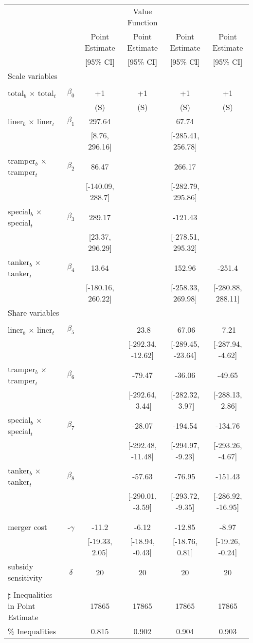 \begin{tabular}{@{\extracolsep{5pt}}lccccc}
\toprule 
 &  &  & Value Function &  &  \\
 &  & Point Estimate & Point Estimate & Point Estimate & Point Estimate \\
 &  & [95\% CI] & [95\% CI] & [95\% CI] & [95\% CI] \\
\midrule 
Scale variables &  &  &  &  &  \\
 &  &  &  &  \\
total$_{b}$ $\times$ total$_{t}$ & $\beta_0$ & +1 & +1 & +1 & +1 \\
 &  & (S) & (S) & (S) & (S) \\
liner$_{b}$ $\times$ liner$_{t}$ & $\beta_1$ & 297.64 &  & 67.74 &  \\
 &  & [8.76, 296.16] &  & [-285.41, 256.78] &  \\
tramper$_{b}$ $\times$ tramper$_{t}$ & $\beta_2$ & 86.47 &  & 266.17 &  \\
 &  & [-140.09, 288.7] &  & [-282.79, 295.86] &  \\
special$_{b}$ $\times$ special$_{t}$ & $\beta_3$ & 289.17 &  & -121.43 &  \\
 &  & [23.37, 296.29] &  & [-278.51, 295.32] &  \\
tanker$_{b}$ $\times$ tanker$_{t}$ & $\beta_4$ & 13.64 &  & 152.96 & -251.4 \\
 &  & [-180.16, 260.22] &  & [-258.33, 269.98] & [-280.88, 288.11] \\
Share variables &  &  &  &  &  \\
 &  &  &  &  &  \\
liner$_{b}$ $\times$ liner$_{t}$ & $\beta_5$ &  & -23.8 & -67.06 & -7.21 \\
 &  &  & [-292.34, -12.62] & [-289.45, -23.64] & [-287.94, -4.62] \\
tramper$_{b}$ $\times$ tramper$_{t}$ & $\beta_6$ &  & -79.47 & -36.06 & -49.65 \\
 &  &  & [-292.64, -3.44] & [-282.32, -3.97] & [-288.13, -2.86] \\
special$_{b}$ $\times$ special$_{t}$ & $\beta_7$ &  & -28.07 & -194.54 & -134.76 \\
 &  &  & [-292.48, -11.48] & [-294.97, -9.23] & [-293.26, -4.67] \\
tanker$_{b}$ $\times$ tanker$_{t}$ & $\beta_8$ &  & -57.63 & -76.95 & -151.43 \\
 &  &  & [-290.01, -3.59] & [-293.72, -9.35] & [-286.92, -16.95] \\
 &  &  &  &  &  \\
 &  &  &  &  &  \\
merger cost & -$\gamma$ & -11.2 & -6.12 & -12.85 & -8.97 \\
 &  & [-19.33, 2.05] & [-18.94, -0.43] & [-18.76, 0.81] & [-19.26, -0.24] \\
subsidy sensitivity & $\delta$ & 20 & 20 & 20 & 20 \\
 &  &  &  &  &  \\
\hline 
$\sharp$ Inequalities in Point Estimate &  & 17865 & 17865 & 17865 & 17865 \\
\% Inequalities &  & 0.815 & 0.902 & 0.904 & 0.903 \\
\bottomrule 
\end{tabular}
